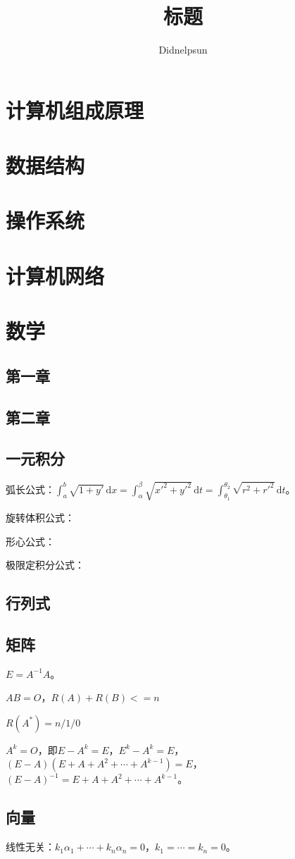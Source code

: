 \documentclass[UTF8, 12pt]{ctexart}
\author{Didnelpsun}
\title{标题}
\date{}
\begin{document}
\maketitle
\pagestyle{empty}
\thispagestyle{empty}
\tableofcontents
\thispagestyle{empty}
\newpage
\pagestyle{plain}
\setcounter{page}{1}
\section{计算机组成原理}
\section{数据结构}
\section{操作系统}
\section{计算机网络}
\section{数学}
\subsection{第一章}
\subsection{第二章}
\subsection{一元积分}

弧长公式：$\int_a^b\sqrt{1+y'}\,\textrm{d}x=\int_\alpha^\beta\sqrt{x'^2+y'^2}\,\textrm{d}t=\int_{\theta_1}^{\theta_2}\sqrt{r^2+r'^2}\,\textrm{d}t$。

旋转体积公式：

形心公式：

极限定积分公式：

\subsection{行列式}
\subsection{矩阵}

$E=A^{-1}A$。

$AB=O$，$R(A)+R(B)<=n$

$R(A^*)=n/1/0$

$A^k=O$，即$E-A^k=E$，$E^k-A^k=E$，$(E-A)(E+A+A^2+\cdots+A^{k-1})=E$，$(E-A)^{-1}=E+A+A^2+\cdots+A^{k-1}$。
\subsection{向量}

线性无关：$k_1\alpha_1+\cdots+k_n\alpha_n=0$，$k_1=\cdots=k_n=0$。
\end{document}
